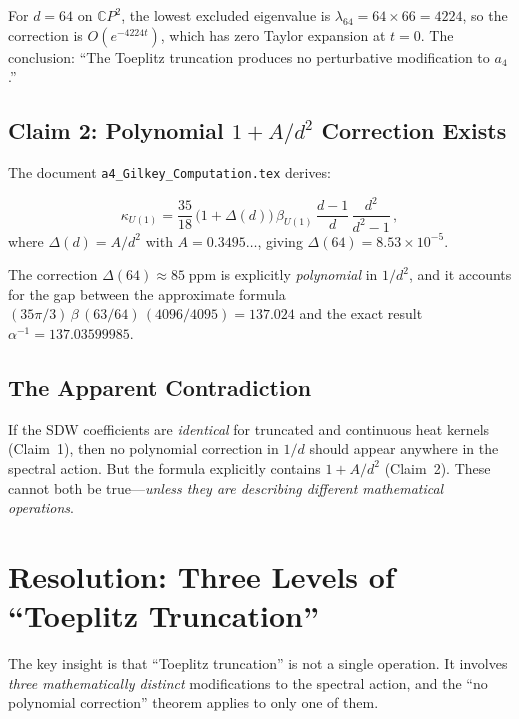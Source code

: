 \documentclass[12pt,a4paper]{article}
\theoremstyle{definition}
\begin{document}
For $d=64$ on $\mathbb{C}P^2$, the lowest excluded eigenvalue is
$\lambda_{64} = 64 \times 66 = 4224$, so the correction is
$O(e^{-4224t})$, which has zero Taylor expansion at $t=0$.
The conclusion: ``The Toeplitz truncation produces no perturbative
modification to $a_4$.''

\subsection{Claim 2: Polynomial $1+A/d^2$ Correction Exists}

The document \texttt{a4\_Gilkey\_Computation.tex} derives:

\begin{tcolorbox}[title=Theorem 5.1 (Complete Formula for $\kappa_{U(1)}$)]
\begin{equation}
\kappa_{U(1)} = \frac{35}{18}\,
\bigl(1 + \Delta(d)\bigr)\,\beta_{U(1)}\,
\frac{d-1}{d}\,\frac{d^2}{d^2-1}\,,
\end{equation}
where $\Delta(d) = A/d^2$ with $A = 0.3495\ldots$, giving
$\Delta(64) = 8.53 \times 10^{-5}$.
\end{tcolorbox}

The correction $\Delta(64) \approx 85\;\mathrm{ppm}$ is explicitly
\emph{polynomial} in $1/d^2$, and it accounts for the gap between
the approximate formula $(35\pi/3)\,\beta\,(63/64)\,(4096/4095) = 137.024$
and the exact result $\alpha^{-1} = 137.03599985$.

\subsection{The Apparent Contradiction}

If the SDW coefficients are \emph{identical} for truncated and continuous
heat kernels (Claim~1), then no polynomial correction in $1/d$ should
appear anywhere in the spectral action.  But the formula explicitly
contains $1 + A/d^2$ (Claim~2).  These cannot both be true---\emph{unless
they are describing different mathematical operations}.

\section{Resolution: Three Levels of ``Toeplitz Truncation''}
\label{sec:resolution}

The key insight is that ``Toeplitz truncation'' is not a single operation.
It involves \emph{three mathematically distinct} modifications to the
spectral action, and the ``no polynomial correction'' theorem applies
to only one of them.
\end{document}
